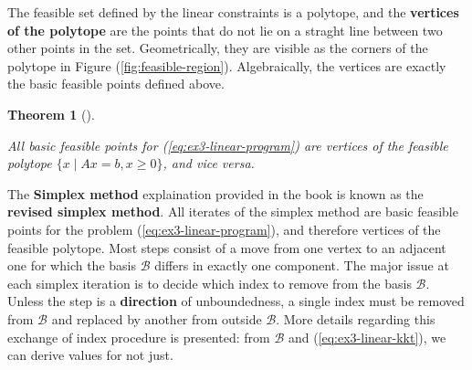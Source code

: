 \documentclass[unicode,11pt,a4paper,oneside,numbers=endperiod,openany, draft]{scrartcl}
\newtheorem{theorem}{Theorem}[section]
\newcommand{\myth}[3]{
    \begin{theorem}[#1] 
        \label{#2} 
        #3 
    \end{theorem}
}
\begin{document}
The feasible set defined by the linear constraints is a polytope,
and the \textbf{vertices of the polytope} are the points that do not lie on a straght line
between two other points in the set.
Geometrically,
they are visible as the corners of the polytope in Figure (\ref{fig:feasible-region}).
Algebraically, the vertices are exactly the basic feasible points defined above.

\myth{}{th:ex3-vertices-polytope}{
    All basic feasible points for (\ref{eq:ex3-linear-program})
    are vertices of the feasible polytope
    \( \{ x \mid Ax = b, x \geq 0 \} \),
    and vice versa.
}

The \textbf{Simplex method} explaination provided in the book
is known as the \textbf{revised simplex method}.
All iterates of the simplex method are basic feasible points
for the problem (\ref{eq:ex3-linear-program}),
and therefore vertices of the feasible polytope.
Most steps consist of a move from one vertex to an adjacent one
for which the basis \( \mathcal{B} \) differs in exactly one component.
The major issue at each simplex iteration is to decide which index to remove from the basis 
\( \mathcal{B} \).
Unless the step is a \textbf{direction} of unboundedness,
a single index must be removed from \( \mathcal{B} \) and replaced by another from outside 
\( \mathcal{B} \).
More details regarding this exchange of index procedure is presented:
from \( \mathcal{B} \) and (\ref{eq:ex3-linear-kkt}), we can derive values for not just.
\end{document}
